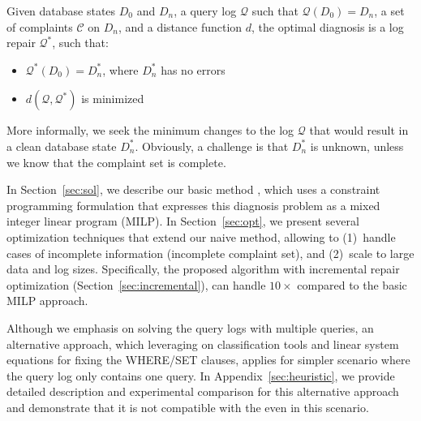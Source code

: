 \begin{definition}\label{def:problem}
    Given database states $D_0$ and $D_n$, a query log $\mathcal{Q}$ such that $\mathcal{Q}(D_0)=D_n$, a set of complaints $\mathcal{C}$ on $D_n$,  and a distance function $d$, the optimal diagnosis is a log repair $\mathcal{Q}^*$, such that:
    \begin{itemize}[itemsep=0pt, parsep=0pt]
        \item $\mathcal{Q}^*(D_0)=D_n^*$, where $D_n^*$ has no errors
        \item $d(\mathcal{Q}, \mathcal{Q}^*)$ is minimized
    \end{itemize}
\end{definition}

More informally, we seek the minimum changes to the log $\mathcal{Q}$
that would result in a clean database state $D_n^*$. Obviously, a
challenge is that $D_n^*$ is unknown, unless we know that the
complaint set is complete. 

In Section~\ref{sec:sol}, we describe our basic method \naive, 
which
uses a constraint programming formulation that expresses this
diagnosis problem as a mixed integer linear program (MILP). 
In Section~\ref{sec:opt}, we present several optimization
techniques that extend our naive method, allowing \sys to 
(1)~handle
cases of incomplete information (incomplete complaint set), and
(2)~scale to large data and log sizes. Specifically, the proposed \sys algorithm with incremental
repair optimization (Section~\ref{sec:incremental}), can
handle $10\times$ compared to the basic MILP approach. 

Although we emphasis on solving the query logs with multiple queries, 
an alternative approach, which leveraging on classification tools and linear system equations for 
fixing the WHERE/SET clauses, applies for simpler scenario where the query log only contains one query. 
In Appendix~\ref{sec:heuristic}, we provide detailed description and experimental comparison 
for this alternative approach and demonstrate that it is not compatible with the \sys even in this
scenario. 



